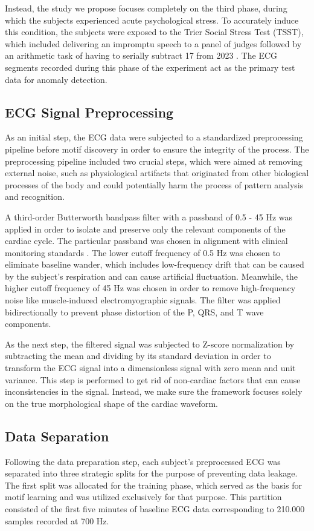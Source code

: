 \documentclass[conference,10pt]{IEEEtran}
\begin{document}
Instead, the study we propose focuses completely on the third phase, during which the subjects experienced acute psychological stress. To accurately induce this condition, the subjects were exposed to the Trier Social Stress Test (TSST), which included delivering an impromptu speech to a panel of judges followed by an arithmetic task of having to serially subtract 17 from 2023 \cite{r3}. The ECG segments recorded during this phase of the experiment act as the primary test data for anomaly detection. 

\subsection{ECG Signal Preprocessing}

As an initial step, the ECG data were subjected to a standardized preprocessing pipeline before motif discovery in order to ensure the integrity of the process. The preprocessing pipeline included two crucial steps, which were aimed at removing external noise, such as physiological artifacts that originated from other biological processes of the body and could potentially harm the process of pattern analysis and recognition. 

A third-order Butterworth bandpass filter with a passband of 0.5 - 45 Hz was applied in order to isolate and preserve only the relevant components of the cardiac cycle. The particular passband was chosen in alignment with clinical monitoring standards \cite{r17}. The lower cutoff frequency of 0.5 Hz was chosen to eliminate baseline wander, which includes low-frequency drift that can be caused by the subject’s respiration and can cause artificial fluctuation. Meanwhile, the higher cutoff frequency of 45 Hz was chosen in order to remove high-frequency noise like muscle-induced electromyographic signals. The filter was applied bidirectionally to prevent phase distortion of the P, QRS, and T wave components.

As the next step, the filtered signal was subjected to Z-score normalization by subtracting the mean and dividing by its standard deviation in order to transform the ECG signal into a dimensionless signal with zero mean and unit variance. This step is performed to get rid of non-cardiac factors that can cause inconsistencies in the signal. Instead, we make sure the framework focuses solely on the true morphological shape of the cardiac waveform.

\subsection{Data Separation}
Following the data preparation step, each subject’s preprocessed ECG was separated into three strategic splits for the purpose of preventing data leakage. 
The first split was allocated for the training phase, which served as the basis for motif learning and was utilized exclusively for that purpose. This partition consisted of the first five minutes of baseline ECG data corresponding to 210.000 samples recorded at 700 Hz.
\end{document}
